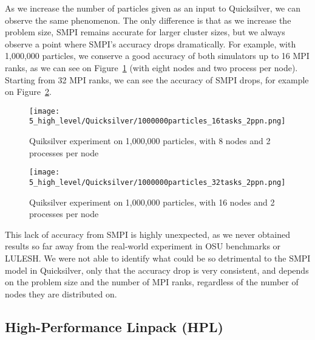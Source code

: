 As we increase the number of particles given as an input to Quicksilver, we can
observe the same phenomenon. The only difference is that as we increase the
problem size, SMPI remains accurate for larger cluster sizes, but we always
observe a point where SMPI's accuracy drops dramatically. For example, with
1,000,000 particles, we conserve a good accuracy of both simulators up to 16 MPI
ranks, as we can see on Figure~\ref{fig:5_high_level:quicksilver_16tasks_2ppn}
(with eight nodes and two process per node). Starting from 32 MPI ranks, we can
see the accuracy of SMPI drops, for example on
Figure~\ref{fig:5_high_level:quicksilver_32tasks_2ppn}.

\begin{figure}[!tb]
    \centering
    \texttt{[image: 5\_high\_level/Quicksilver/1000000particles\_16tasks\_2ppn.png]}
    \caption{Quiksilver experiment on 1,000,000 particles, with 8 nodes and 2 processes per node}
    \label{fig:5_high_level:quicksilver_16tasks_2ppn}
\end{figure}

\begin{figure}[!tb]
    \centering
    \texttt{[image: 5\_high\_level/Quicksilver/1000000particles\_32tasks\_2ppn.png]}
    \caption{Quiksilver experiment on 1,000,000 particles, with 16 nodes and 2 processes per node}
    \label{fig:5_high_level:quicksilver_32tasks_2ppn}
\end{figure}

This lack of accuracy from SMPI is highly unexpected, as we never obtained
results so far away from the real-world experiment in OSU benchmarks or LULESH.
We were not able to identify what could be so detrimental to the SMPI model in
Quicksilver, only that the accuracy drop is very consistent, and depends on the
problem size and the number of MPI ranks, regardless of the number of nodes they
are distributed on.

\subsection{High-Performance Linpack (HPL)}

